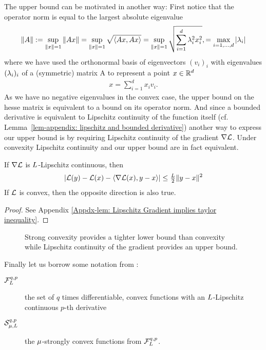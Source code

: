 The upper bound can be motivated in another way: First notice that
the operator norm is equal to the largest absolute eigenvalue
\begin{align*}
	\|A\| := \sup_{\|x\| =1} \|Ax\|
	= \sup_{\|x\| =1} \sqrt{\langle Ax, Ax\rangle}
	= \sup_{\|x\| =1} \sqrt{\sum_{i=1}^\dimension \hesseEV_i^2 x_i^2},
	= \max_{i=1,\dots,\dimension} |\hesseEV_i|
\end{align*}
where we have used the orthonormal basis of eigenvectors \((v_i)_i\) with
eigenvalues \((\hesseEV_i)_i\) of a (symmetric) matrix A to represent a point
\(x\in\reals^\dimension\)
\begin{align*}
	x = \sum_{i=1}^{d}x_i v_i.
\end{align*}
As we have no negative eigenvalues in the convex case, the upper bound on the
hesse matrix is equivalent to a bound on its operator norm. And since a
bounded derivative is equivalent to Lipschitz continuity of the function itself
(cf. Lemma~\ref{lem-appendix: lipschitz and bounded derivative}) another way
to express our upper bound is by requiring Lipschitz continuity of the gradient
\(\nabla \Loss\). Under convexity Lipschitz continuity and our upper bound are
in fact equivalent.
%
\begin{lemma}
	\label{lem: Lipschitz Gradient implies taylor inequality}
	If \(\nabla \Loss\) is \(\ubound\)-Lipschitz continuous, then
	\begin{align*}
		| \Loss(y) - \Loss(x) - \langle \nabla \Loss(x), y-x\rangle |
		\le \tfrac{\ubound}2 \|y-x\|^2
	\end{align*}
	If \(\Loss\) is convex, then the opposite direction is also true.
\end{lemma}
\begin{proof}
	See Appendix \ref{Appdx-lem: Lipschitz Gradient implies taylor inequality}.
\end{proof}
%
\begin{figure}[h]
	\centering
	\def\svgwidth{1\textwidth}
	
	\caption{Strong convexity provides a tighter lower bound than convexity
	while Lipschitz continuity of the gradient provides an upper bound.}
	\label{fig: visualize strong convexity}
\end{figure}
%
\begin{definition}
	Finally let us borrow some notation from \citeauthor{nesterovLecturesConvexOptimization2018}:
	\begin{description}
		\item[{\(\lipGradientSet[q,p]{\ubound}\)}] the set of \(q\) times
		differentiable, convex functions with an \(\ubound\)-Lipschitz continuous
		\(p\)-th derivative
		\item[{\(\strongConvex[q,p]{\lbound}{\ubound}\)}] the \(\lbound\)-strongly convex
		functions from \(\lipGradientSet[q,p]{\ubound}\).
	\end{description}
\end{definition}

